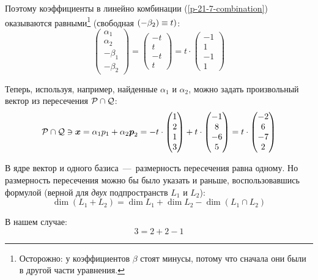 \documentclass[a4paper,12pt]{article}
\begin{document}
\begin{solution}
    Поэтому коэффициенты в линейно комбинации (\ref{p-21-7-combination}) оказываются равными\footnote{Осторожно: у коэффициентов $\beta$ стоят минусы, потому что сначала они были в другой части уравнения.} (свободная $(-\beta_2) \hm\equiv t)$:
    \[
      \begin{pmatrix}
        \alpha_1 \\ \alpha_2 \\ -\beta_1 \\ -\beta_2
      \end{pmatrix} = \begin{pmatrix}
        -t \\ t \\ -t \\ t
      \end{pmatrix} = t \cdot \begin{pmatrix}
        -1 \\ 1 \\ -1 \\ 1
      \end{pmatrix}
    \]
    
    Теперь, используя, например, найденные $\alpha_1$ и $\alpha_2$, можно задать произвольный вектор из пересечения $\mathcal P \hm\cap \mathcal Q$:
    \[
      \mathcal P \cap \mathcal Q \ni \boldsymbol x = \alpha_1 p_1 + \alpha_2 \boldsymbol p_2
      = -t \cdot \begin{pmatrix}
        1 \\ 2 \\ 1 \\ 3
      \end{pmatrix} + t \cdot \begin{pmatrix}
        -1 \\ 8 \\ -6 \\ 5
      \end{pmatrix}
      = t \cdot \begin{pmatrix}
        -2 \\ 6 \\ -7 \\ 2
      \end{pmatrix}
    \]
    
    В ядре вектор и одного базиса~---~размерность пересечения равна одному.
    Но размерность пересечения можно бы было указать и раньше, воспользовавшись формулой (верной для \emph{двух} подпространств $L_1$ и $L_2$):
    \[
      \dim(L_1 + L_2) = \dim L_1 + \dim L_2 - \dim(L_1 \cap L_2)
    \]
    
    В нашем случае:
    \[
      3 = 2 + 2 - 1
    \]
  \end{solution}
  
\end{document}
